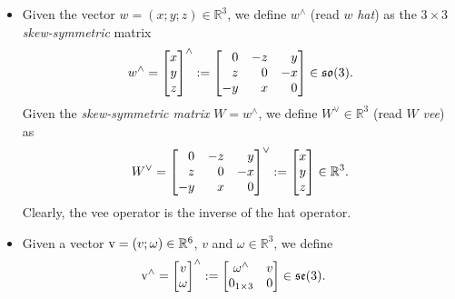 \begin{itemize}
\item Given the vector $w = (x; y; z) \in \mathbb{R}^3$, 
we define $w^\wedge$ (read $w$ {\em hat}) as the $3\times3$ \emph{skew-symmetric} matrix 
\begin{equation}\label{eq:hat3}
w^\wedge = 
\begin{bmatrix} 
 x \\ 
 y \\
 z 
\end{bmatrix}^{\wedge}
:=
\begin{bmatrix}
  \phm 0   & -z     & \phm y \\
  \phm z   & \phm 0 & -x     \\
      -y   & \phm x & \phm 0 
\end{bmatrix} \in \so(3).
\end{equation}
Given the \emph{skew-symmetric matrix} $W = w^\wedge$, 
we define $W^\vee \in \mathbb{R}^3$ (read $W$ {\em vee}) as
\begin{equation}
W^{\vee} = 
\begin{bmatrix}
  \phm 0   & -z     & \phm y \\
  \phm z   & \phm 0 & -x     \\
      -y   & \phm x & \phm 0 
\end{bmatrix}^{\vee}
:=
\begin{bmatrix} 
 x \\ 
 y \\
 z 
\end{bmatrix}
\in \mathbb{R}^3 .
\end{equation}
Clearly, the vee operator is the inverse of the hat operator. 



\item 
Given a vector ${\rm v} = ( v; \omega ) \in \mathbb{R}^6$, 
$v$ and $\omega \in \mathbb{R}^3$, we define
\begin{align}\label{eq:hat6}
  {\rm v}^{\wedge} 
  =
 \begin{bmatrix}
  v \\
  \omega
  \end{bmatrix}
  ^{\wedge} 
& :=
  \begin{bmatrix} 
    \omega^\wedge & v \\
    0_{1\times3}  & 0 
  \end{bmatrix} \in \mathfrak{se}(3).
\end{align}


\end{itemize}
